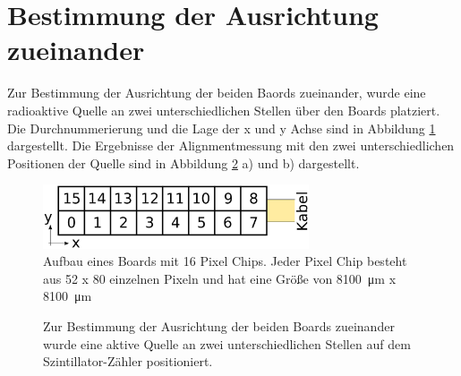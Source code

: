 \documentclass[usenames,dvipsnames]{include/protokollclass}
\begin{document}
	\section{Bestimmung der Ausrichtung zueinander}
	Zur Bestimmung der Ausrichtung der beiden Baords zueinander, wurde eine radioaktive Quelle an zwei unterschiedlichen Stellen über den Boards platziert. Die Durchnummerierung und die Lage der x und y Achse sind in Abbildung \ref{fig:board} dargestellt. Die Ergebnisse der Alignmentmessung mit den zwei unterschiedlichen Positionen der Quelle sind in Abbildung \ref{fig:alignment} a) und b) dargestellt.
	\begin{figure}
		\centering
		\includegraphics[width=0.7\textwidth]{fig/board.eps}
		\caption{Aufbau eines Boards mit 16 Pixel Chips. Jeder Pixel Chip besteht aus 52 x 80 einzelnen Pixeln und hat eine Größe von \SI{8100}{\micro\meter} x \SI{8100}{\micro\meter}}
		\label{fig:board}
	\end{figure}
	\begin{figure}
		\centering
	\label{fig:alignment_1}
	\label{fig:alignment_2}	
	\caption{Zur Bestimmung der Ausrichtung der beiden Boards zueinander wurde eine aktive Quelle an zwei unterschiedlichen Stellen auf dem Szintillator-Zähler positioniert.}
	\label{fig:alignment}
	\end{figure}
\end{document}
